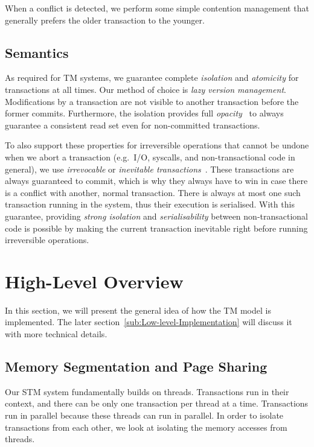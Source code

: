 \documentclass{sigplanconf}
\begin{document}
When a conflict is detected, we perform some simple contention
management that generally prefers the older transaction to the younger.

\subsection{Semantics}

As required for TM systems, we guarantee complete \emph{isolation} and
\emph{atomicity} for transactions at all times. Our method of choice
is \emph{lazy version management}. Modifications by a transaction are
not visible to another transaction before the former commits.
Furthermore, the isolation provides full
\emph{opacity}~\cite{guerraoui08} to always guarantee a consistent
read set even for non-committed transactions.

To also support these properties for irreversible operations that
cannot be undone when we abort a transaction (e.g.\ I/O, syscalls, and
non-transactional code in general), we use \emph{irrevocable} or
\emph{inevitable transactions}~\cite{blundell06,spear08}. These transactions are always
guaranteed to commit, which is why they always have to win in case
there is a conflict with another, normal transaction. There is always
at most one such transaction running in the system, thus their
execution is serialised. With this guarantee, providing \emph{strong
isolation} and \emph{serialisability} between non-transactional code
is possible by making the current transaction inevitable right before
running irreversible operations.



\section{High-Level Overview}

In this section, we will present the general idea of how the TM model is
implemented.  The later section~\ref{sub:Low-level-Implementation} will
discuss it with more technical details.

\subsection{Memory Segmentation and Page Sharing}

Our STM system fundamentally builds on threads. Transactions run in
their context, and there can be only one transaction per thread at a
time. Transactions run in parallel because these threads can run in
parallel. In order to isolate transactions from each other, we look
at isolating the memory accesses from threads.
\end{document}
